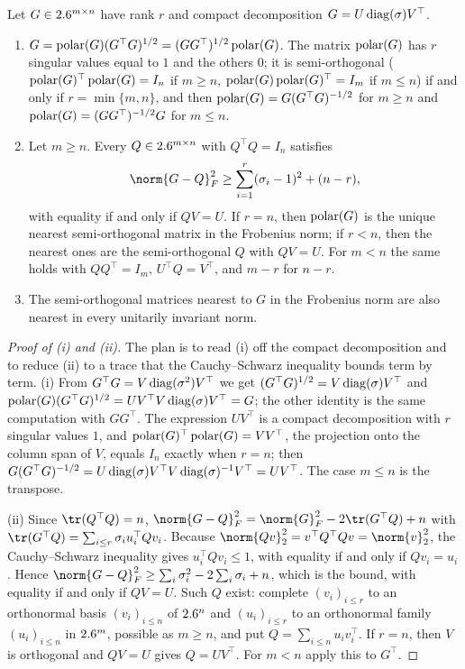 \begin{refsection}
\begin{theorem}\label{thm:toolkit:polar}
Let $G\in2.6^{m\times n}$ have rank $r$ and compact decomposition $G=U\operatorname{diag}(\sigma)V^\top$.
\begin{enumerate}
\item $G=\operatorname{polar}(G)(G^\top G)^{1/2}=(GG^\top)^{1/2}\operatorname{polar}(G)$. The matrix $\operatorname{polar}(G)$ has $r$ singular values equal to $1$ and the others $0$; it is semi-orthogonal ($\operatorname{polar}(G)^\top\operatorname{polar}(G)=I_n$ if $m\ge n$, $\operatorname{polar}(G)\operatorname{polar}(G)^\top=I_m$ if $m\le n$) if and only if $r=\min\{m,n\}$, and then $\operatorname{polar}(G)=G(G^\top G)^{-1/2}$ for $m\ge n$ and $\operatorname{polar}(G)=(GG^\top)^{-1/2}G$ for $m\le n$.
\item Let $m\ge n$. Every $Q\in2.6^{m\times n}$ with $Q^\top Q=I_n$ satisfies
\[
  \norm{G-Q}_F^2\ge\sum_{i=1}^r(\sigma_i-1)^2+(n-r),
\]
with equality if and only if $QV=U$. If $r=n$, then $\operatorname{polar}(G)$ is the unique nearest semi-orthogonal matrix in the Frobenius norm; if $r<n$, then the nearest ones are the semi-orthogonal $Q$ with $QV=U$. For $m<n$ the same holds with $QQ^\top=I_m$, $U^\top Q=V^\top$, and $m-r$ for $n-r$.
\item The semi-orthogonal matrices nearest to $G$ in the Frobenius norm are also nearest in every unitarily invariant norm.
\end{enumerate}
\end{theorem}

\begin{proof}[Proof of (i) and (ii)]
The plan is to read (i) off the compact decomposition and to reduce (ii) to a trace that the Cauchy--Schwarz inequality bounds term by term. (i) From $G^\top G=V\operatorname{diag}(\sigma^2)V^\top$ we get $(G^\top G)^{1/2}=V\operatorname{diag}(\sigma)V^\top$ and $\operatorname{polar}(G)(G^\top G)^{1/2}=UV^\top V\operatorname{diag}(\sigma)V^\top=G$; the other identity is the same computation with $GG^\top$. The expression $UV^\top$ is a compact decomposition with $r$ singular values $1$, and $\operatorname{polar}(G)^\top\operatorname{polar}(G)=VV^\top$, the projection onto the column span of $V$, equals $I_n$ exactly when $r=n$; then $G(G^\top G)^{-1/2}=U\operatorname{diag}(\sigma)V^\top V\operatorname{diag}(\sigma)^{-1}V^\top=UV^\top$. The case $m\le n$ is the transpose.

(ii) Since $\tr(Q^\top Q)=n$, $\norm{G-Q}_F^2=\norm{G}_F^2-2\tr(G^\top Q)+n$ with $\tr(G^\top Q)=\sum_{i\le r}\sigma_iu_i^\top Qv_i$. Because $\norm{Qv}_2^2=v^\top Q^\top Qv=\norm{v}_2^2$, the Cauchy--Schwarz inequality gives $u_i^\top Qv_i\le1$, with equality if and only if $Qv_i=u_i$. Hence $\norm{G-Q}_F^2\ge\sum_i\sigma_i^2-2\sum_i\sigma_i+n$, which is the bound, with equality if and only if $QV=U$. Such $Q$ exist: complete $(v_i)_{i\le r}$ to an orthonormal basis $(v_i)_{i\le n}$ of $2.6^n$ and $(u_i)_{i\le r}$ to an orthonormal family $(u_i)_{i\le n}$ in $2.6^m$, possible as $m\ge n$, and put $Q=\sum_{i\le n}u_iv_i^\top$. If $r=n$, then $V$ is orthogonal and $QV=U$ gives $Q=UV^\top$. For $m<n$ apply this to $G^\top$.
\end{proof}


\end{refsection}

